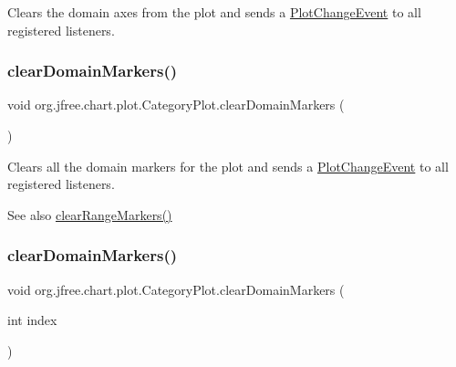 Clears the domain axes from the plot and sends a \mbox{\hyperlink{}{Plot\+Change\+Event}} to all registered listeners. \mbox{\label{classorg_1_1jfree_1_1chart_1_1plot_1_1_category_plot_adf28326359bc5e6dd6a3584db74629c7}} 
\subsubsection{\texorpdfstring{clear\+Domain\+Markers()}{clearDomainMarkers()}\hspace{0.1cm}{\footnotesize\ttfamily [1/2]}}
{\footnotesize\ttfamily void org.\+jfree.\+chart.\+plot.\+Category\+Plot.\+clear\+Domain\+Markers (\begin{DoxyParamCaption}{ }\end{DoxyParamCaption})}

Clears all the domain markers for the plot and sends a \mbox{\hyperlink{}{Plot\+Change\+Event}} to all registered listeners.

\begin{DoxySeeAlso}{See also}
\mbox{\hyperlink{classorg_1_1jfree_1_1chart_1_1plot_1_1_category_plot_a8d328087c6f781c211f40c6af8af6025}{clear\+Range\+Markers()}} 
\end{DoxySeeAlso}
\mbox{\label{classorg_1_1jfree_1_1chart_1_1plot_1_1_category_plot_a32b248b8669388ee35fead74182cd8d0}} 
\subsubsection{\texorpdfstring{clear\+Domain\+Markers()}{clearDomainMarkers()}\hspace{0.1cm}{\footnotesize\ttfamily [2/2]}}
{\footnotesize\ttfamily void org.\+jfree.\+chart.\+plot.\+Category\+Plot.\+clear\+Domain\+Markers (\begin{DoxyParamCaption}\item[{int}]{index }\end{DoxyParamCaption})}

